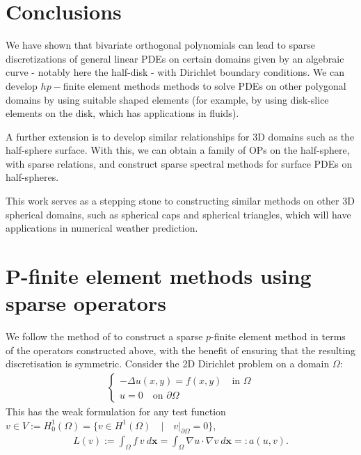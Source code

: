 \documentclass[11pt, oneside]{article}   	%
\newcommand{\bstodoinline}{\todo[color=pink,inline=true]}
\begin{document}
%
\section{Conclusions}

\bstodoinline{Rewritten}

We have shown that bivariate orthogonal polynomials can lead to sparse discretizations of general linear PDEs on certain domains given by an algebraic curve - notably here the half-disk - with Dirichlet boundary conditions. We can develop $hp-$finite element methods methods to solve PDEs on other polygonal domains by using suitable shaped elements (for example, by using disk-slice elements on the disk, which has applications in fluids). 

A further extension is to develop similar relationships for 3D domains such as the half-sphere surface. With this, we can obtain a family of OPs on the half-sphere, with sparse relations, and construct sparse spectral methods for surface PDEs on half-spheres. 

This work serves as a stepping stone to constructing similar methods on other 3D spherical domains, such as spherical caps and spherical triangles, which will have applications in numerical weather prediction. 

%
\appendix
%
\section{P-finite element methods using sparse operators}\label{Appendix:PFEM}

We follow the method of \cite{beuchler2006new} to construct a sparse $p$-finite element method in terms of the operators constructed above, with the benefit of ensuring that the resulting discretisation is symmetric. Consider the 2D Dirichlet problem on a domain $\Omega$:
\begin{align*}
	\begin{cases}
         - \Delta u(x,y) = f(x,y) \quad \text{in } \Omega \\
         u = 0 \quad \text{on } \partial \Omega
         \end{cases}
\end{align*}
This has the weak formulation for any test function $v \in V := H_0^1(\Omega) = \{v \in H^1(\Omega) \quad | \quad v|_{\partial \Omega} = 0 \}$,
\begin{align*}
	L(v) := \int_\Omega f \: v \: d\mathbf{x} = \int_\Omega \nabla u \cdot \nabla v \: d\mathbf{x} =: a(u,v).
\end{align*}
\end{document}
